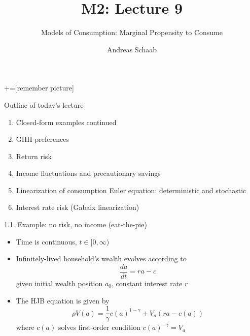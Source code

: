 \documentclass[10pt]{beamer}
\title{\large M2: Lecture 9}
\subtitle{Models of Consumption: Marginal Propensity to Consume}
\author{Andreas Schaab}
\date{}
\begin{document}
+=[remember picture]
\thispagestyle{empty}
\maketitle 
\newpage

\addtocounter{framenumber}{-1}




\begin{frame}{Outline of today's lecture}
\addtocounter{framenumber}{-1}

\begin{enumerate}
\item Closed-form examples continued
\item GHH preferences
\item Return risk
\item Income fluctuations and precautionary savings 
\item Linearization of consumption Euler equation: deterministic and stochastic 
\item Interest rate risk (Gabaix linearization)
\end{enumerate}
\end{frame}



\begin{frame}{1.1. Example: no risk, no income (eat-the-pie)}
\begin{itemize}
\item Time is continuous, $t \in [0, \infty)$

\item Infinitely-lived household's wealth evolves according to 
\begin{equation*}
	\frac{da}{dt} = ra - c
\end{equation*}
given initial wealth position $a_0$, constant interest rate $r$

\item The HJB equation is given by
\begin{equation*}
	\rho V(a) = \frac{1}{\gamma} c(a)^{1-\gamma} + V_a (r a - c(a))
\end{equation*}
where $c(a)$ solves first-order condition $c(a)^{-\gamma} = V_a$
\end{itemize}
\end{frame}
\end{document}
